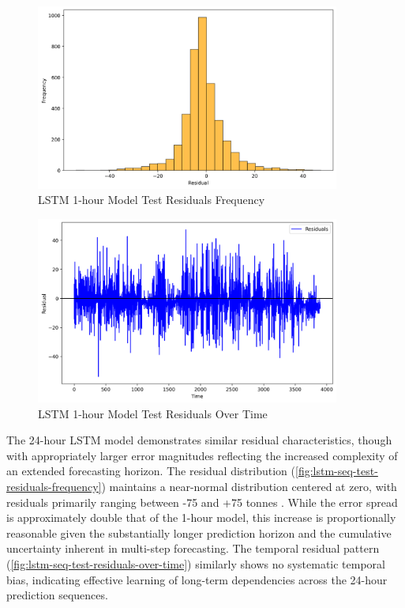 \begin{figure}[ht]
  \centering
  \includegraphics[width=10cm]{sections/figures/lstm_point_test_residuals_frequency.png}
  \caption{LSTM 1-hour Model Test Residuals Frequency}
  \label{fig:lstm-point-test-residuals-frequency}
\end{figure}

\begin{figure}[ht]
  \centering
  \includegraphics[width=10cm]{sections/figures/lstm_point_test_residuals_over_time.png}
  \caption{LSTM 1-hour Model Test Residuals Over Time}
  \label{fig:lstm-point-test-residuals-over-time}
\end{figure}

The 24-hour LSTM model demonstrates similar residual characteristics, though with appropriately larger error magnitudes reflecting the increased complexity of an extended forecasting horizon. The residual distribution (\autoref{fig:lstm-seq-test-residuals-frequency}) maintains a near-normal distribution centered at zero, with residuals primarily ranging between -75 and +75 tonnes \cotwoe{}. While the error spread is approximately double that of the 1-hour model, this increase is proportionally reasonable given the substantially longer prediction horizon and the cumulative uncertainty inherent in multi-step forecasting. The temporal residual pattern (\autoref{fig:lstm-seq-test-residuals-over-time}) similarly shows no systematic temporal bias, indicating effective learning of long-term dependencies across the 24-hour prediction sequences.

